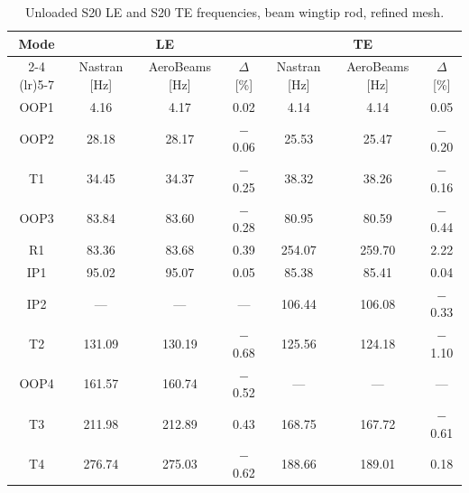 \documentclass[journal]{new-aiaa}
\begin{document}
\begin{table}[ht!]
    \centering
    \caption{Unloaded S20 LE and S20 TE frequencies, beam wingtip rod, refined mesh.}
    \label{tab:S20_beamrod_modal_frequencies}
    \setlength{\tabcolsep}{4pt}
    \begin{tabular}{c ccc ccc}
        \toprule
        \multirow{2}{*}{Mode} & \multicolumn{3}{c}{LE} & \multicolumn{3}{c}{TE} \\
        \cmidrule(lr){2-4} \cmidrule(lr){5-7}
        & Nastran [Hz] & AeroBeams [Hz] & $\Delta$ [\%] & Nastran [Hz] & AeroBeams [Hz] & $\Delta$ [\%] \\
        \midrule
        OOP1 & 4.16 & 4.17 & 0.02 & 4.14 & 4.14 & 0.05 \\
        OOP2 & 28.18 & 28.17 & $-$0.06 & 25.53 & 25.47 & $-$0.20 \\
        T1 & 34.45 & 34.37 & $-$0.25 & 38.32 & 38.26 & $-$0.16 \\
        OOP3 & 83.84 & 83.60 & $-$0.28 & 80.95 & 80.59 & $-$0.44 \\
        R1 & 83.36 & 83.68 & 0.39 & 254.07 & 259.70 & 2.22 \\
        IP1 & 95.02 & 95.07 & 0.05 & 85.38 & 85.41 & 0.04 \\
        IP2 & --- & --- & --- & 106.44 & 106.08 & $-$0.33 \\
        T2 & 131.09 & 130.19 & $-$0.68 & 125.56 & 124.18 & $-$1.10 \\
        OOP4 & 161.57 & 160.74 & $-$0.52 & --- & --- & --- \\
        T3 & 211.98 & 212.89 & 0.43 & 168.75 & 167.72 & $-$0.61 \\
        T4 & 276.74 & 275.03 & $-$0.62 & 188.66 & 189.01 & 0.18 \\
        \bottomrule
    \end{tabular}
\end{table}
\end{document}
